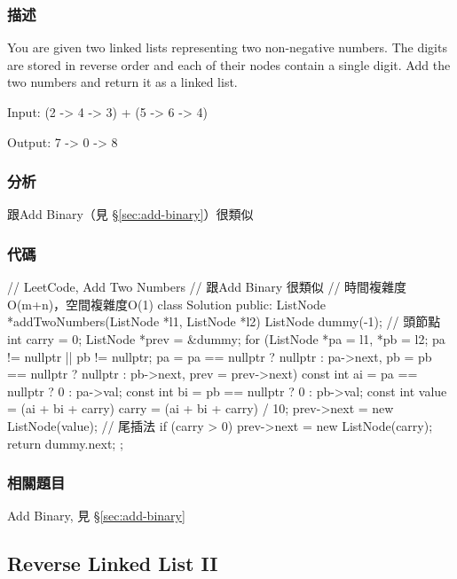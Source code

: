 \subsubsection{描述}
You are given two linked lists representing two non-negative numbers. The digits are stored in reverse order and each of their nodes contain a single digit. Add the two numbers and return it as a linked list.

Input: {\small {} (2 -> 4 -> 3) + (5 -> 6 -> 4)}

Output: {\small {} 7 -> 0 -> 8}


\subsubsection{分析}
跟Add Binary（見 \S \ref{sec:add-binary}）很類似


\subsubsection{代碼}
\begin{Code}
// LeetCode, Add Two Numbers
// 跟Add Binary 很類似
// 時間複雜度O(m+n)，空間複雜度O(1)
class Solution {
public:
    ListNode *addTwoNumbers(ListNode *l1, ListNode *l2) {
        ListNode dummy(-1); // 頭節點
        int carry = 0;
        ListNode *prev = &dummy;
        for (ListNode *pa = l1, *pb = l2;
             pa != nullptr || pb != nullptr;
             pa = pa == nullptr ? nullptr : pa->next,
             pb = pb == nullptr ? nullptr : pb->next,
             prev = prev->next) {
            const int ai = pa == nullptr ? 0 : pa->val;
            const int bi = pb == nullptr ? 0 : pb->val;
            const int value = (ai + bi + carry) %
            carry = (ai + bi + carry) / 10;
            prev->next = new ListNode(value); // 尾插法
        }
        if (carry > 0)
            prev->next = new ListNode(carry);
        return dummy.next;
    }
};
\end{Code}


\subsubsection{相關題目}

\begindot
\item Add Binary, 見 \S \ref{sec:add-binary}
\myenddot


\subsection{Reverse Linked List II}
\label{sec:reverse-linked-list-ii}


